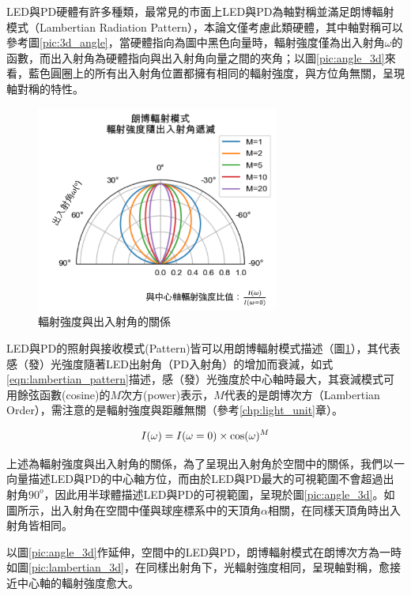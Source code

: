        LED與PD硬體有許多種類，最常見的市面上LED與PD為軸對稱並滿足朗博輻射模式（Lambertian Radiation Pattern），本論文僅考慮此類硬體，其中軸對稱可以參考圖\ref{pic:3d_angle}，當硬體指向為圖中黑色向量時，輻射強度僅為出入射角$\omega$的函數，而出入射角為硬體指向與出入射角向量之間的夾角；以圖\ref{pic:angle_3d}來看，藍色圓圈上的所有出入射角位置都擁有相同的輻射強度，與方位角無關，呈現軸對稱的特性。

        \begin{figure}[htpb]
            \centering
            \includegraphics[width=8cm]{ch2pic/lambertian.png}
            \caption{輻射強度與出入射角的關係}
            \label{pic:lambertian}
        \end{figure}

        LED與PD的照射與接收模式(Pattern)皆可以用朗博輻射模式描述（圖\ref{pic:lambertian}），其代表感（發）光強度隨著LED出射角（PD入射角）的增加而衰減，如式\ref{eqn:lambertian_pattern}描述，感（發）光強度於中心軸時最大，其衰減模式可用餘弦函數(cosine)的$M$次方(power)表示，$M$代表的是朗博次方（Lambertian Order），需注意的是輻射強度與距離無關（參考\ref{chp:light_unit}章）。

        \begin{equation}
            \label{eqn:lambertian_pattern}
            I(\omega)=I(\omega=0)\times\cos(\omega)^{M}\\
        \end{equation}


        上述為輻射強度與出入射角的關係，為了呈現出入射角於空間中的關係，我們以一向量描述LED與PD的中心軸方位，而由於LED與PD最大的可視範圍不會超過出射角$90^{o}$，因此用半球體描述LED與PD的可視範圍，呈現於圖\ref{pic:angle_3d}。如圖所示，出入射角在空間中僅與球座標系中的天頂角$\alpha$相關，在同樣天頂角時出入射角皆相同。

        以圖\ref{pic:angle_3d}作延伸，空間中的LED與PD，朗博輻射模式在朗博次方為一時如圖\ref{pic:lambertian_3d}，在同樣出射角下，光輻射強度相同，呈現軸對稱，愈接近中心軸的輻射強度愈大。

